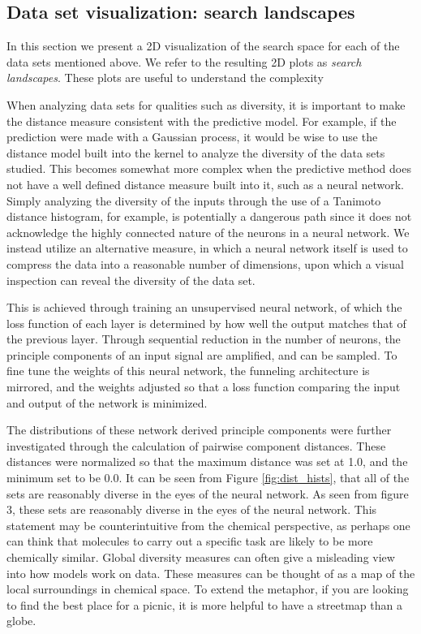 \subsection{Data set visualization: search landscapes}

In this section we present a 2D visualization of the search space for each of the data sets mentioned above. We refer to the resulting 2D plots as \emph{search landscapes}. These plots are useful to understand the complexity  

When analyzing data sets for qualities such as diversity, it is important to make the distance measure consistent with the predictive model.  For example, if the prediction were made with a Gaussian process, it would be wise to use the distance model built into the kernel to analyze the diversity of the data sets studied.  This becomes somewhat more complex when the predictive method does not have a well defined distance measure built into it, such as a neural network.  Simply analyzing the diversity of the inputs through the use of a Tanimoto distance histogram, for example, is potentially a dangerous path since it does not acknowledge the highly connected nature of the neurons in a neural network.  We instead utilize an alternative measure, in which a neural network itself is used to compress the data into a reasonable number of dimensions, \cite{Hinton_2006} upon which a visual inspection can reveal the diversity of the data set.

This is achieved through training an unsupervised neural network, of which the loss function of each layer is determined by how well the output matches that of the previous layer.  Through sequential reduction in the number of neurons, the principle components of an input signal are amplified, and can be sampled.  To fine tune the weights of this neural network, the funneling architecture is mirrored, and the weights adjusted so that a loss function comparing the input and output of the network is minimized.

The distributions of these network derived principle components were further investigated through the calculation of pairwise component distances. These distances were normalized so that the maximum distance was set at 1.0, and the minimum set to be 0.0. It can be seen from Figure \ref{fig:dist_hists}, that all of the sets are reasonably diverse in the eyes of the neural network.  As seen from figure 3, these sets are reasonably diverse in the eyes of the neural network. This statement may be counterintuitive from the chemical perspective, as perhaps one can think that molecules to carry out a specific task are likely to be more chemically similar. Global diversity measures can often give a misleading view into how models work on data. These measures can be thought of as a map of the local surroundings in chemical space.  To extend the metaphor, if you are looking to find the best place for a picnic, it is more helpful to have a streetmap than a globe.

